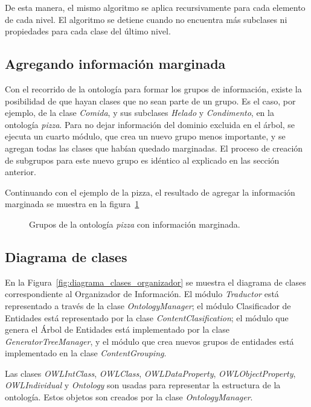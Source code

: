 De esta manera, el mismo algoritmo se aplica recursivamente para cada elemento de cada nivel. El algoritmo se detiene cuando no encuentra más subclases ni propiedades para cada clase del último nivel.

\subsection{Agregando información marginada}
Con el recorrido de la ontología para formar los grupos de información, existe la posibilidad de que hayan clases que no sean parte de un grupo. Es el caso, por ejemplo, de la clase \emph{Comida}, y sus subclases \emph{Helado} y \emph{Condimento}, en la ontología \emph{pizza}. Para no dejar información del dominio excluida en el árbol, se ejecuta un cuarto módulo, que crea un nuevo grupo menos importante, y se agregan todas las clases que habían quedado marginadas. El proceso de creación de subgrupos para este nuevo grupo es idéntico al explicado en las sección anterior.

Continuando con el ejemplo de la pizza, el resultado de agregar la  información marginada se muestra en la figura~\ref{fig:macro_planning_pizza_marg}

\begin{figure}[H]
\centering
\begin{minipage}[c]{0.7\textwidth}
{\footnotesize 
{}
}
\caption{Grupos de la ontología \emph{pizza} con información marginada.}
\label{fig:macro_planning_pizza_marg}
\end{minipage}
\end{figure}

\subsection{Diagrama de clases}
En la Figura~\ref{fig:diagrama_clases_organizador} se muestra el diagrama de clases correspondiente al Organizador de Información. El módulo \emph{Traductor} está representado a través de la clase \emph{OntologyManager}; el módulo Clasificador de Entidades está representado por la clase \emph{ContentClasification}; el módulo que genera el Árbol de Entidades está implementado por la clase \emph{GeneratorTreeManager}, y el módulo que crea nuevos grupos de entidades está implementado en la clase \emph{ContentGrouping}. 

Las clases \emph{OWLIntClass},  \emph{OWLClass},  \emph{OWLDataProperty},  \emph{OWLObjectProperty}, \emph{OWLIndividual} y  \emph{Ontology} son usadas para representar la estructura de la ontología. Estos objetos son creados por la clase  \emph{OntologyManager}. 

